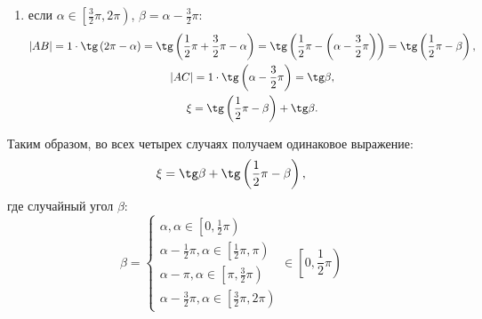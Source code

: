 \documentclass[12pt,a4paper]{article}
\begin{document}
\begin{enumerate}
        \item если $\alpha \in \left [ \frac{3}{2} \pi, 2 \pi \right )$, $\beta = \alpha - \frac{3}{2} \pi$:
        \begin{gather}
            \modulus{AB} = 1 \cdot \tg \left ( 2 \pi - \alpha \right ) = \tg \left ( \frac{1}{2} \pi + \frac{3}{2} \pi - \alpha \right ) = \tg \left ( \frac{1}{2} \pi - \left ( \alpha - \frac{3}{2} \pi \right ) \right ) = \tg \left ( \frac{1}{2} \pi - \beta \right ), \\
            \modulus{AC} = 1 \cdot \tg \left ( \alpha - \frac{3}{2} \pi \right ) = \tg \beta , \\
            \xi = \tg \left ( \frac{1}{2} \pi - \beta \right ) + \tg \beta.
        \end{gather}
    \end{enumerate}
    Таким образом, во всех четырех случаях получаем одинаковое выражение:
    \begin{equation}
        \xi = \tg \beta + \tg \left ( \frac{1}{2} \pi - \beta \right ) ,
    \end{equation}
    где случайный угол $\beta$:
    \begin{equation}
        \beta =
        \left \{
        \begin{array}{ll}
            \alpha, \alpha \in \left [ 0, \frac{1}{2} \pi \right )                     \\
            \alpha - \frac{1}{2} \pi, \alpha \in \left [ \frac{1}{2} \pi, \pi \right ) \\
            \alpha - \pi, \alpha \in \left [ \pi, \frac{3}{2} \pi \right )             \\
            \alpha - \frac{3}{2} \pi, \alpha \in \left [ \frac{3}{2} \pi, 2 \pi \right )
        \end{array}
        \right .
        \in \left [ 0, \frac{1}{2} \pi \right )
    \end{equation}
\end{document}
